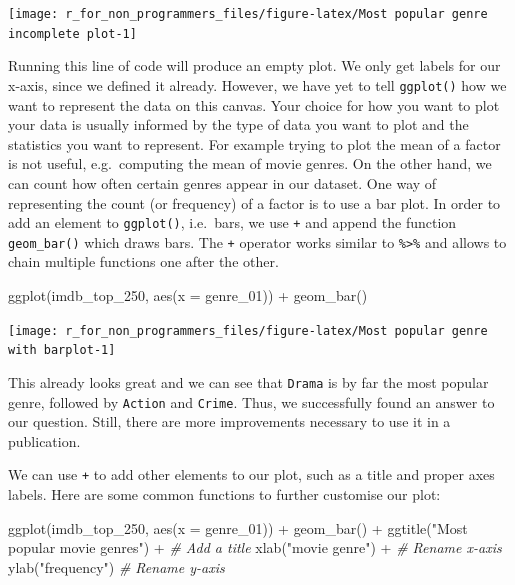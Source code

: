 \documentclass[
]{book}
\newenvironment{Shaded}{\begin{snugshade}}{\end{snugshade}}
\newcommand{\AttributeTok}[1]{\textcolor[rgb]{0.77,0.63,0.00}{#1}}
\newcommand{\CommentTok}[1]{\textcolor[rgb]{0.56,0.35,0.01}{\textit{#1}}}
\newcommand{\FunctionTok}[1]{\textcolor[rgb]{0.00,0.00,0.00}{#1}}
\newcommand{\NormalTok}[1]{#1}
\newcommand{\SpecialCharTok}[1]{\textcolor[rgb]{0.00,0.00,0.00}{#1}}
\newcommand{\StringTok}[1]{\textcolor[rgb]{0.31,0.60,0.02}{#1}}
\begin{document}
\begin{center}\texttt{[image: r\_for\_non\_programmers\_files/figure-latex/Most popular genre incomplete plot-1]} \end{center}

Running this line of code will produce an empty plot. We only get labels for our x-axis, since we defined it already. However, we have yet to tell \texttt{ggplot()} how we want to represent the data on this canvas. Your choice for how you want to plot your data is usually informed by the type of data you want to plot and the statistics you want to represent. For example trying to plot the mean of a factor is not useful, e.g.~computing the mean of movie genres. On the other hand, we can count how often certain genres appear in our dataset. One way of representing the count (or frequency) of a factor is to use a bar plot. In order to add an element to \texttt{ggplot()}, i.e.~bars, we use \texttt{+} and append the function \texttt{geom\_bar()} which draws bars. The \texttt{+} operator works similar to \texttt{\%\textgreater{}\%} and allows to chain multiple functions one after the other.

\begin{Shaded}
\begin{Highlighting}[]
\FunctionTok{ggplot}\NormalTok{(imdb\_top\_250, }\FunctionTok{aes}\NormalTok{(}\AttributeTok{x =}\NormalTok{ genre\_01)) }\SpecialCharTok{+}
  \FunctionTok{geom\_bar}\NormalTok{()}
\end{Highlighting}
\end{Shaded}

\begin{center}\texttt{[image: r\_for\_non\_programmers\_files/figure-latex/Most popular genre with barplot-1]} \end{center}

This already looks great and we can see that \texttt{Drama} is by far the most popular genre, followed by \texttt{Action} and \texttt{Crime}. Thus, we successfully found an answer to our question. Still, there are more improvements necessary to use it in a publication.

We can use \texttt{+} to add other elements to our plot, such as a title and proper axes labels. Here are some common functions to further customise our plot:

\begin{Shaded}
\begin{Highlighting}[]
\FunctionTok{ggplot}\NormalTok{(imdb\_top\_250, }\FunctionTok{aes}\NormalTok{(}\AttributeTok{x =}\NormalTok{ genre\_01)) }\SpecialCharTok{+}
  \FunctionTok{geom\_bar}\NormalTok{() }\SpecialCharTok{+}
  \FunctionTok{ggtitle}\NormalTok{(}\StringTok{"Most popular movie genres"}\NormalTok{) }\SpecialCharTok{+}  \CommentTok{\# Add a title}
  \FunctionTok{xlab}\NormalTok{(}\StringTok{"movie genre"}\NormalTok{) }\SpecialCharTok{+}                   \CommentTok{\# Rename x{-}axis}
  \FunctionTok{ylab}\NormalTok{(}\StringTok{"frequency"}\NormalTok{)                       }\CommentTok{\# Rename y{-}axis}
\end{Highlighting}
\end{Shaded}
\end{document}
